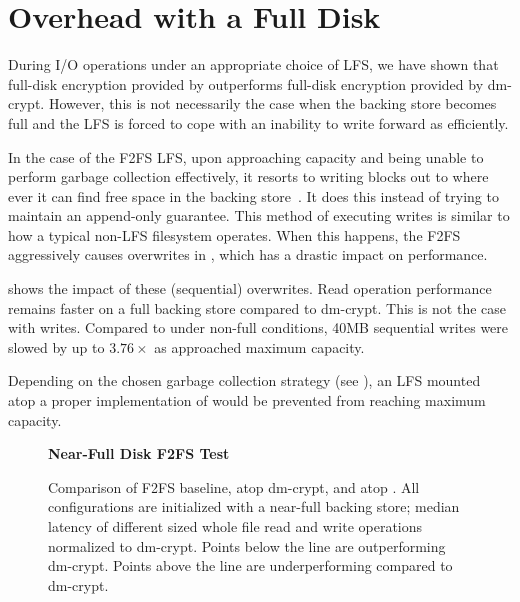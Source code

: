 \section{Overhead with a Full Disk}

During I/O operations under an appropriate choice of LFS, we have shown that
full-disk encryption provided by \SYSTEM{} outperforms full-disk encryption
provided by dm-crypt. However, this is not necessarily the case when the backing
store becomes full and the LFS is forced to cope with an inability to write
forward as efficiently.

In the case of the F2FS LFS, upon approaching capacity and being unable to
perform garbage collection effectively, it resorts to writing blocks out to
where ever it can find free space in the backing store~\cite{F2FS}. It does this
instead of trying to maintain an append-only guarantee. This method of executing
writes is similar to how a typical non-LFS filesystem operates. When this
happens, the F2FS aggressively causes overwrites in \SYSTEM{}, which has a
drastic impact on performance.

 shows the impact of these (sequential) overwrites.
Read operation performance remains faster on a full \SYSTEM{} backing store
compared to dm-crypt. This is not the case with writes. Compared to \SYSTEM{}
under non-full conditions, 40MB sequential writes were slowed by up to
$3.76\times$ as \SYSTEM{} approached maximum capacity.

Depending on the chosen garbage collection strategy (see
), an LFS mounted atop a proper implementation of
\SYSTEM{} would be prevented from reaching maximum capacity.

\begin{figure}[ht]
    \textbf{Near-Full Disk F2FS Test}\par\medskip
    \centering
    {}
    \caption{Comparison of F2FS baseline, atop dm-crypt, and atop
      \SYSTEM{}. All configurations are initialized with a near-full
      backing store; median latency of different sized whole file read
      and write operations normalized to dm-crypt. Points below the
      line are outperforming dm-crypt. Points above the line are
      underperforming compared to dm-crypt.}
    \label{fig:microbench-f2fs-full}
\end{figure}

